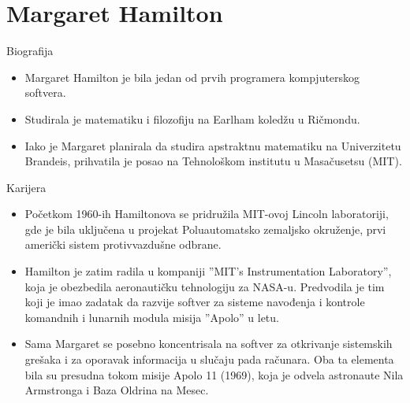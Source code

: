 \documentclass[aspectratio=169]{beamer}
\begin{document}
\section{Margaret Hamilton}
\begin{frame}{Biografija}

    \begin{itemize}
        \item<1-> Margaret Hamilton je bila jedan od prvih programera kompjuterskog softvera.
        
        \item<2-> Studirala je matematiku i filozofiju na Earlham koledžu u Ričmondu.
        
        \item<3->Iako je Margaret planirala da studira apstraktnu matematiku na Univerzitetu Brandeis, prihvatila je posao na Tehnološkom institutu u Masačusetsu (MIT).
    \end{itemize}


\end{frame}
\begin{frame}{Karijera}

    \begin{itemize}
        \item<1-> Početkom 1960-ih Hamiltonova se pridružila MIT-ovoj Lincoln laboratoriji, gde je bila uključena u projekat Poluautomatsko zemaljsko okruženje, prvi američki sistem protivvazdušne odbrane.
        
        \item<2->Hamilton je zatim radila u kompaniji ''MIT’s Instrumentation Laboratory'', koja je obezbedila aeronautičku tehnologiju za NASA-u. Predvodila je tim koji je imao zadatak da razvije softver za sisteme navođenja i kontrole komandnih i lunarnih modula misija ''Apolo'' u letu.
        
        \item<3-> Sama Margaret se posebno koncentrisala na softver za otkrivanje sistemskih grešaka i za oporavak informacija u slučaju pada računara. Oba ta elementa bila su presudna tokom misije Apolo 11 (1969), koja je odvela astronaute Nila Armstronga i Baza Oldrina na Mesec.
    \end{itemize}


\end{frame}
\end{document}
